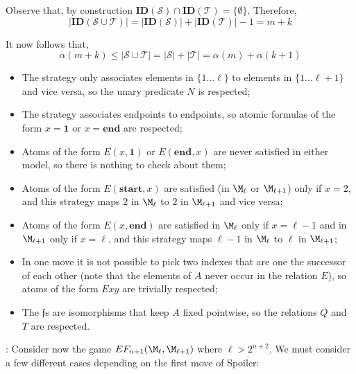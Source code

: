   Observe that, by construction $\mathbf{ID}(\mathcal{S}) \cap
  \mathbf{ID}(\mathcal{T})=\{\emptyset\}$. Therefore,
  $$|\mathbf{ID}(\mathcal{S} \cup \mathcal{T})| = |\mathbf{ID}(\mathcal{S})|+
  |\mathbf{ID}(\mathcal{T})|-1=m+k$$

  It now follows that,
  $$\alpha(m+k) \leq |\mathcal{S} \cup \mathcal{T}|=|\mathcal{S}|+
  |\mathcal{T}| = \alpha(m)+\alpha(k+1) $$


\begin{itemize}
\item The strategy only associates elements in $\{1 \ldots \ell\}$ to elements in $\{1\ldots \ell+1\}$ and vice versa, so the unary predicate $N$ is respected;
\item The strategy associates endpoints to endpoints, so atomic formulas of the form $x = \textbf{1}$ or $x = \textbf{end}$ are respected;
\item Atoms of the form $E(x,\textbf{1})$ or $E(\textbf{end},x)$ are never satisfied in either model, so there is nothing to check about them;
\item Atoms of the form $E(\textbf{start},x)$ are satisfied (in $\M_\ell$ or $\M_{\ell+1}$) only if $x=2$, and this strategy maps $2$ in $\M_\ell$ to $2$ in $\M_{\ell+1}$ and vice versa;
\item Atoms of the form $E(x, \textbf{end})$ are satisfied in $\M_\ell$ only if $x = \ell-1$ and in $\M_{\ell+1}$ only if $x = \ell$, and this strategy maps $\ell-1$ in $\M_{\ell}$ to $\ell$ in $\M_{\ell+1}$;
\item In one move it is not possible to pick two indexes that are one the successor of each other (note that the elements of $A$ never occur in the relation $E$), so atoms of the form $Exy$ are trivially respected;
\item The $\mathfrak f$s are isomorphisms that keep $A$ fixed pointwise, so the relations $Q$ and $T$ are respected.
\end{itemize}
\item[Induction Case]: Consider now the game $EF_{n+1}(\M_{\ell}, \M_{\ell+1})$ where $\ell > 2^{n+2}$. We must consider a few different cases depending on the first move of Spoiler:
